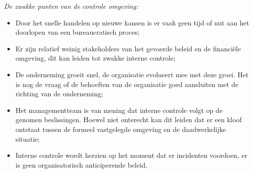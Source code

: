 \medskip
\noindent
\textit{De zwakke punten van de controle omgeving:}
\begin{itemize}
    \item Door het snelle handelen op nieuwe kansen is er vaak geen tijd of nut aan het doorlopen van een bureaucratisch proces;
    \item Er zijn relatief weinig stakeholders van het gevoerde beleid en de financiële omgeving, dit kan leiden tot zwakke interne controle;
    \item De onderneming groeit snel, de organisatie evolueert mee met deze groei. Het is nog de vraag of de behoeften van de organisatie goed aansluiten met de richting van de onderneming;
    \item Het managementteam is van mening dat interne controle volgt op de genomen beslissingen. Hoewel niet onterecht kan dit leiden dat er een kloof ontstaat tussen de formeel vastgelegde omgeving en de daadwerkelijke situatie;
    \item Interne controle wordt herzien op het moment dat er incidenten voordoen, er is geen organisatorisch anticiperende beleid.
\end{itemize}

\newpage